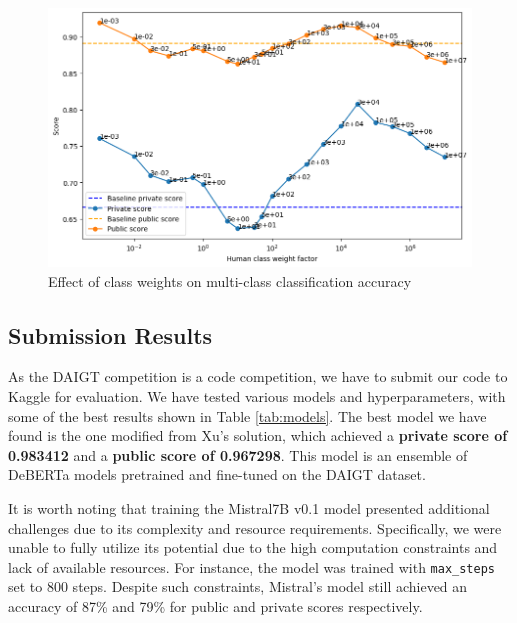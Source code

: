 \documentclass[conference]{IEEEtran}
\begin{document}
\begin{figure}[htbp]
  \centerline{\includegraphics[width=\columnwidth]{figs/multiclass.png}}
  \caption{Effect of class weights on multi-class classification accuracy}
  \label{fig:multiclass}
\end{figure}

\subsection{Submission Results}

As the DAIGT competition is a code competition, we have to submit our code to Kaggle for evaluation. We have tested various models and hyperparameters, with some of the best results shown in Table \ref{tab:models}. The best model we have found is the one modified from Xu's \cite{2ndplace} solution, which achieved a \textbf{private score of 0.983412} and a \textbf{public score of 0.967298}. This model is an ensemble of DeBERTa models pretrained and fine-tuned on the DAIGT dataset.

It is worth noting that training the Mistral7B v0.1 model presented additional challenges due to its complexity and resource requirements. Specifically, we were unable to fully utilize its potential due to the high computation constraints and lack of available resources. For instance, the model was trained with \texttt{max\_steps} set to 800 steps. Despite such constraints, Mistral’s model still achieved an accuracy of 87\% and 79\% for public and private scores respectively.
\end{document}
